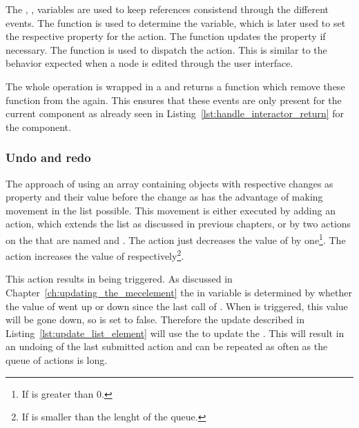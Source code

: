 The , ,  variables are used to keep references consistend through the different events.
The  function is used to determine the  variable, which is later used to set the respective property for the action.
The  function updates the  property if necessary.
The  function is used to dispatch the action.
This is similar to the behavior expected when a node is edited through the user interface.

The whole operation is wrapped in a  and returns a function which remove these function from the  again.
This ensures that these events are only present for the current  component as already seen in Listing~\ref{lst:handle_interactor_return} for the  component.

\subsubsection{Undo and redo}\label{ch:undo_redo}

The approach of using an array containing objects with respective changes as  property and their value before the change as  has the advantage of making movement in the list possible.
This movement is either executed by adding an action, which extends the list as discussed in previous chapters, or by two actions on the  that are named  and .
The  action just decreases the value of  by one\footnote{If  is greater than 0.}.
The  action increases the value of  respectively\footnote{If  is smaller than the lenght of the queue.}.

This action results in  being triggered.
As discussed in Chapter~\ref{ch:updating_the_mecelement} the  in  variable is determined by whether the value of  went up or down since the last call of .
When  is triggered, this value will be gone down, so  is set to false.
Therefore the update described in Listing~\ref{lst:update_list_element} will use the  to update the .
This will result in an undoing of the last submitted action and can be repeated as often as the queue of actions is long.

